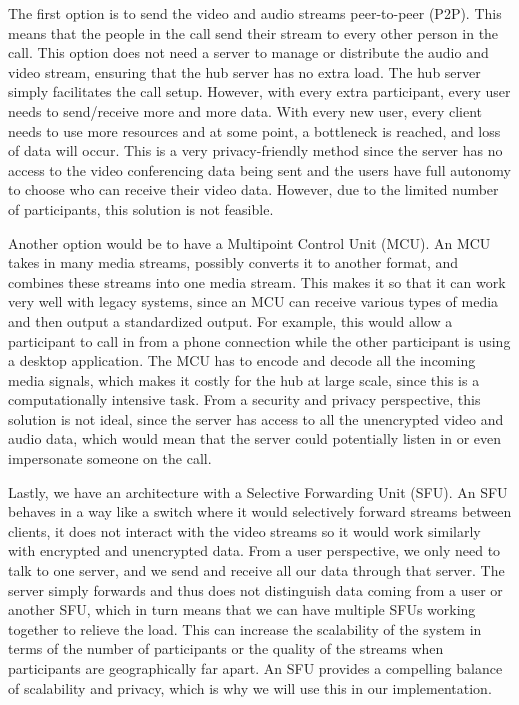 \documentclass{report}
\begin{document}
The first option is to send the video and audio streams peer-to-peer (P2P). This means that the people in
the call send their stream to every other person in the call. This option does not need a server to manage or
distribute the audio and video stream, ensuring that the hub server has no extra load. The hub server simply
facilitates the call setup. However, with every extra participant, every user needs to send/receive more and more
data. With every new user, every client needs to use more resources and at some point, a bottleneck is
reached, and loss of data will occur. This is a very privacy-friendly method since the server has no access to the
video conferencing data being sent and the users have full autonomy to choose who can receive their video data.
However, due to the limited number of participants, this solution is not feasible.

Another option would be to have a Multipoint Control Unit (MCU). An MCU takes in many media streams, possibly
converts it to another format, and combines these streams into one media stream. This makes it so that it can work
very well with legacy systems, since an MCU can receive various types of media and then output a standardized
output. For example, this would allow a participant to call in from a phone connection while the other participant
is using a desktop application. The MCU has to encode and decode all the incoming media signals, which makes it
costly for the hub at large scale, since this is a computationally intensive task. From a security and privacy
perspective, this solution is not ideal, since the server has access to all the unencrypted video and audio data,
which would mean that the server could potentially listen in or even impersonate someone on the call.

Lastly, we have an architecture with a Selective Forwarding Unit (SFU). An SFU behaves in a way like a switch where it
would selectively forward streams between clients, it does not interact with the video streams so it would work
similarly with encrypted and unencrypted data. From a user perspective, we only need to talk to one server, and we
send and receive all our data through that server. The server simply forwards and thus does not distinguish data
coming from a user or another SFU, which in turn means that we can have multiple SFUs working together to relieve
the load. This can increase the scalability of the system in terms of the number of participants or the quality of the streams when
participants are geographically far apart. An SFU provides a compelling balance of scalability and privacy, which is
why we will use this in our implementation.
\end{document}
